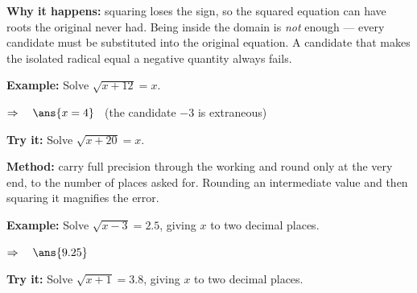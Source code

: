 \documentclass[12pt]{article}
\begin{document}
\begin{formulabox}
\textbf{Why it happens:} squaring loses the sign, so the squared equation can
have roots the original never had. Being inside the domain is \emph{not} enough
--- every candidate must be substituted into the original equation. A candidate
that makes the isolated radical equal a negative quantity always fails.
\end{formulabox}

\begin{examplebox}
\textbf{Example:} \quad Solve $\sqrt{x+12} = x$.

$\Rightarrow\quad \ans{x = 4}$ \ (the candidate $-3$ is extraneous)
\end{examplebox}

\begin{tryitbox}
\textbf{Try it:} \quad Solve $\sqrt{x+20} = x$.\\[2pt]
\end{tryitbox}


\begin{formulabox}
\textbf{Method:} carry full precision through the working and round only at the
very end, to the number of places asked for. Rounding an intermediate value and
then squaring it magnifies the error.
\end{formulabox}

\begin{examplebox}
\textbf{Example:} \quad Solve $\sqrt{x-3} = 2.5$, giving $x$ to two decimal
places.

$\Rightarrow\quad \ans{9.25}$
\end{examplebox}

\begin{tryitbox}
\textbf{Try it:} \quad Solve $\sqrt{x+1} = 3.8$, giving $x$ to two decimal
places.\\[2pt]
\end{tryitbox}
\end{document}
